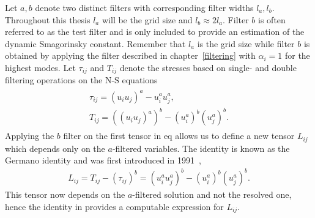 Let $a,b$ denote two distinct filters with corresponding filter widths $l_a,l_b$. 
Throughout this thesis $l_a$ will be the grid size and $l_b\approx 2l_a$. Filter $b$ is
often referred to as the test filter and is only included to provide an estimation 
of the dynamic Smagorinsky constant. Remember that $l_a$ is the grid size while 
filter $b$ is obtained by applying the filter described in chapter~\ref{filtering} with $\alpha_i=1$ for the highest modes.
Let $\tau_{ij}$ and $T_{ij}$ denote the stresses based on single- and double filtering
operations on the N-S equations
\begin{align}
    \begin{split}
    \tau_{ij} = (u_iu_j)^a - u_i^au_j^a,\\
    T_{ij} = ((u_iu_j)^a)^b - (u_i^a)^b(u_j^a)^b.
    \end{split}
    \label{eq:stresstensors}
\end{align}
Applying the $b$ filter on the first tensor in eq allows us to define 
a new tensor $L_{ij}$ which depends only on the $a$-filtered variables. The identity 
is known as the Germano identity and was first introduced in 1991~\cite{Germano91},
\begin{align}
    L_{ij} = T_{ij} - (\tau_{ij})^b
    = (u_i^au_j^a)^b - (u_i^a)^b(u_j^a)^b.
    \label{eq:germanoid}
\end{align}
This tensor now depends on the $a$-filtered solution and not the resolved 
one, hence the identity in provides a computable expression for $L_{ij}$.

